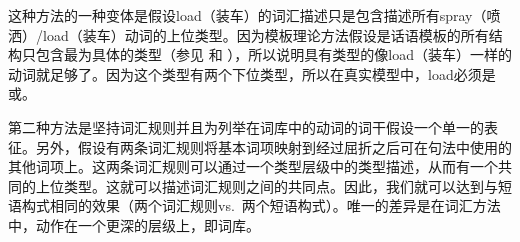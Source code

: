 \begin{exe}
\begin{xlist}[iv.]
\begin{exe}
\begin{xlist}[iv.]
这种方法的一种变体是假设load（装车）的词汇描述只是包含描述所有spray（喷洒）/load（装车）动词的上位类型。因为模板理论方法假设是话语模板的所有结构只包含最为具体的类型（参见 和 ），所以说明具有类型的像load（装车）一样的动词就足够了。因为这个类型有两个下位类型，所以在真实模型中，load必须是或。

第二种方法是坚持词汇规则并且为列举在词库中的动词的词干假设一个单一的表征。另外，假设有两条词汇规则将基本词项映射到经过屈折之后可在句法中使用的其他词项上。这两条词汇规则可以通过一个类型层级中的类型描述，从而有一个共同的上位类型。这就可以描述词汇规则之间的共同点。因此，我们就可以达到与短语构式相同的效果（两个词汇规则vs.\ 两个短语构式）。唯一的差异是在词汇方法中，动作在一个更深的层级上，即词库\citep[--406]{Mueller2002b}。


\end{xlist}
\end{exe}
\end{xlist}
\end{exe}
